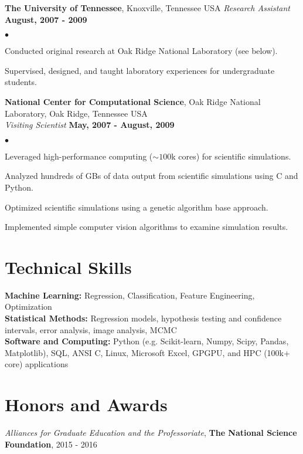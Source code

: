 \documentclass[margin,line, 10pt]{res}
\newenvironment{list2}{
  \begin{list}{$\bullet$}{%
      \setlength{\itemsep}{0in}
      \setlength{\parsep}{0in} \setlength{\parskip}{0in}
      \setlength{\topsep}{0in} \setlength{\partopsep}{0in} 
      \setlength{\leftmargin}{0.2in}}}{\end{list}}
\begin{document}
\begin{resume}
\textbf{The University of Tennessee}, Knoxville, Tennessee USA\newline
\textit{Research Assistant} \hfill \textbf{August, 2007 - 2009}\newline
    \begin{list2}
    	\vspace*{-5mm}
    	\item Conducted original research at Oak Ridge National Laboratory (see below).
    	\item Supervised, designed, and taught laboratory experiences for undergraduate students.
    \end{list2}
\vspace*{-4mm}

\textbf{National Center for Computational Science}, Oak Ridge National Laboratory, Oak Ridge, Tennessee USA\\
\textit{Visiting Scientist} \hfill \textbf{May, 2007 - August, 2009}\\
    \begin{list2}
    	\vspace*{-5mm}
    	\item Leveraged high-performance computing ($\sim 100$k cores) for scientific simulations.
    	\item Analyzed hundreds of GBs of data output from scientific simulations using C and Python.
    	\item Optimized scientific simulations using a genetic algorithm base approach.
    	\item Implemented simple computer vision algorithms to examine simulation results.
    \end{list2}
\vspace*{-5mm}

\section{Technical Skills}
\textbf{Machine Learning:} Regression, Classification, Feature Engineering, Optimization\\
\textbf{Statistical Methods:} Regression models, hypothesis testing and confidence intervals, error analysis, image analysis, MCMC\\
\textbf{Software and Computing:}  Python (e.g. Scikit-learn, Numpy, Scipy, Pandas, Matplotlib), SQL, ANSI C, Linux, Microsoft Excel, GPGPU, and HPC (100k+ core) applications\\
\vspace*{-5mm}

\section{Honors and Awards}
\textit{Alliances for Graduate Education and the Professoriate}, \textbf{The National Science Foundation}, \hfill 2015 - 2016

\end{resume}
\end{document}
